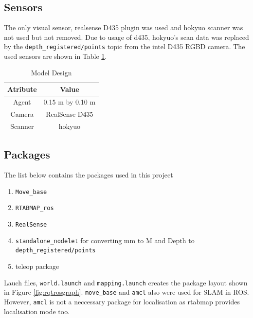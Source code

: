 \documentclass[10pt,journal,compsoc]{IEEEtran}
\begin{document}
\subsection{Sensors}
The only visual sensor, realsense D435 plugin was used and hokyuo scanner was not used but not removed. Due to usage of d435, hokyuo's scan data was replaced by the \verb!depth_registered/points! topic from the intel D435 RGBD camera.
The used sensors are shown in Table \ref{table:model_design}.
\begin{table}[ht]
      \caption{Model Design}
      \label{table:model_design}
      \begin{center}
      \begin{tabular}{|c|c|}
      \hline
      Atribute & Value \\
      \hline\hline
      Agent & 0.15 m by 0.10 m \\
      \hline
      Camera & RealSense D435 \\
      \hline
      Scanner & hokyuo \\
      \hline
      \end{tabular}
      \end{center}
\end{table}

\subsection{Packages}

The list below contains the packages used in this project
\begin{enumerate}
      \item \verb!Move_base!
      \item \verb!RTABMAP_ros!
      \item \verb!RealSense!
      \item \verb!standalone_nodelet! for converting mm to M and Depth to \verb!depth_registered/points!
      \item teleop package
\end{enumerate}
Lauch files, \verb!world.launch! and \verb!mapping.launch! creates the package layout shown in Figure \ref{fig:rqtrosgraph}. \verb!move_base! and \verb!amcl! also were used for SLAM in ROS. However, \verb!amcl! is not a neccessary package for localisation as rtabmap provides localisation mode too.
\end{document}
